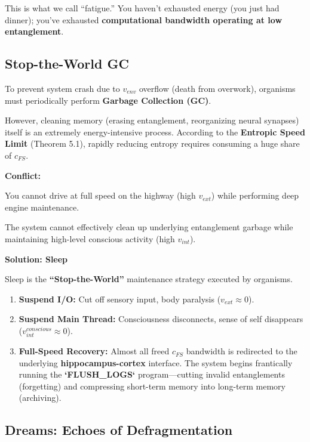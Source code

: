 This is what we call ``fatigue.'' You haven't exhausted energy (you just had dinner); you've exhausted \textbf{computational bandwidth operating at low entanglement}.

\subsection{Stop-the-World GC}

To prevent system crash due to \textbf{$v_{env}$} overflow (death from overwork), organisms must periodically perform \textbf{Garbage Collection (GC)}.

However, cleaning memory (erasing entanglement, reorganizing neural synapses) itself is an extremely energy-intensive process. According to the \textbf{Entropic Speed Limit} (Theorem 5.1), rapidly reducing entropy requires consuming a huge share of \textbf{$c_{FS}$}.

\textbf{Conflict:}

You cannot drive at full speed on the highway (high \textbf{$v_{ext}$}) while performing deep engine maintenance.

The system cannot effectively clean up underlying entanglement garbage while maintaining high-level conscious activity (high \textbf{$v_{int}$}).

\textbf{Solution: Sleep}

Sleep is the \textbf{``Stop-the-World''} maintenance strategy executed by organisms.

\begin{enumerate}
\item \textbf{Suspend I/O:} Cut off sensory input, body paralysis (\textbf{$v_{ext} \approx 0$}).

\item \textbf{Suspend Main Thread:} Consciousness disconnects, sense of self disappears (\textbf{$v_{int}^{conscious} \approx 0$}).

\item \textbf{Full-Speed Recovery:} Almost all freed \textbf{$c_{FS}$} bandwidth is redirected to the underlying \textbf{hippocampus-cortex} interface. The system begins frantically running the \textbf{`FLUSH\_LOGS`} program---cutting invalid entanglements (forgetting) and compressing short-term memory into long-term memory (archiving).
\end{enumerate}

\subsection{Dreams: Echoes of Defragmentation}

